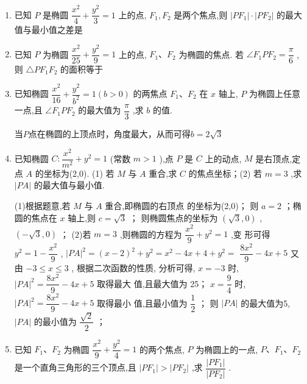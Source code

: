 \begin{enumerate}
    \item 已知 $P$ 是椭圆 $\dfrac{{x}^{2}}{4} + \dfrac{{y}^{2}}{3} = 1$ 上的点, ${F}_{1},{F}_{2}$ 是两个焦点,则 $\left| {P{F}_{1}}\right|  \cdot  \left| {P{F}_{2}}\right|$ 的最大值与最小值之差是 


    \item 已知 $P$ 为椭圆 $\dfrac{{x}^{2}}{25} + \dfrac{{y}^{2}}{9} = 1$ 上的点, ${F}_{1}\text{、}{F}_{2}$ 为椭圆的焦点. 若 $\angle {F}_{1}P{F}_{2} = \dfrac{\pi }{6}$ ,则 $\bigtriangleup  P{F}_{1}{F}_{2}$ 的面积等于


    \item 已知椭圆 $\dfrac{{x}^{2}}{16} + \dfrac{{y}^{2}}{{b}^{2}} = 1\left( {b > 0}\right)$ 的两焦点 ${F}_{1}\text{、}{F}_{2}$ 在 $x$ 轴上, $P$ 为椭圆上任意一点,且 $\angle {F}_{1}P{F}_{2}$ 的最大值为 $\dfrac{\pi }{3}$ ,求 $b$ 的值.
    \begin{jieda}
        当$P$点在椭圆的上顶点时，角度最大，从而可得$b=2\sqrt{3}$
    \end{jieda}


    \item 已知椭圆 $C : \dfrac{{x}^{2}}{{m}^{2}} + {y}^{2} = 1$ (常数 $m > 1$ ),点 $P$ 是 $C$ 上的动点, $M$ 是右顶点,定点 $A$ 的坐标为(2,0). (1) 若 $M$ 与 $A$ 重合,求 $C$ 的焦点坐标；(2) 若 $m = 3$ ,求 $\left| {PA}\right|$ 的最大值与最小值.
    \begin{jieda}
        (1)根据题意,若 $ M $ 与 $ A $ 重合,即椭圆的右顶点
的坐标为(2,0)；
则 $ a = 2 $ ；椭圆的焦点在 $ x $ 轴上,则 $ c = \sqrt{3} $ ；
则椭圆焦点的坐标为 $ \left( {\sqrt{3},0}\right) $ , $ \left( {-\sqrt{3},0}\right) $ ；
(2)若 $ m = 3 $ ,则椭圆的方程为 $ \dfrac{{x}^{2}}{9} + {y}^{2} = 1 $ ,变
形可得 $ {y}^{2} = 1 - \dfrac{{x}^{2}}{9} $ ,
$ {\left| PA\right| }^{2} = {\left( x - 2\right) }^{2} + {y}^{2} = {x}^{2} - {4x} + 4 + {y}^{2} = $
$ \dfrac{8{x}^{2}}{9} - {4x} + 5 $
又由 $ - 3 \leq  x \leq  3 $ ,
根据二次函数的性质, 分析可得,
$ x =  - 3 $ 时, $ {\left| PA\right| }^{2} = \dfrac{8{x}^{2}}{9} - {4x} + 5 $ 取得最大
值,且最大值为 25；
$ x = \dfrac{9}{4} $ 时, $ {\left| PA\right| }^{2} = \dfrac{8{x}^{2}}{9} - {4x} + 5 $ 取得最小
值,且最小值为 $ \dfrac{1}{2} $ ；
则 $ \left| {PA}\right| $ 的最大值为5, $ \left| {PA}\right| $ 的最小值为 $ \dfrac{\sqrt{2}}{2} $ ；
    \end{jieda}


    \item 已知 ${F}_{1}\text{、}{F}_{2}$ 为椭圆 $\dfrac{{x}^{2}}{9} + \dfrac{{y}^{2}}{4} = 1$ 的两个焦点, $P$ 为椭圆上的一点, $P\text{、}{F}_{1}\text{、}{F}_{2}$ 是一个直角三角形的三个顶点,且 $\left| {P{F}_{1}}\right|  > \left| {P{F}_{2}}\right|$ ,求 $\dfrac{\left| P{F}_{1}\right| }{\left| P{F}_{2}\right| }$ .


\end{enumerate}
